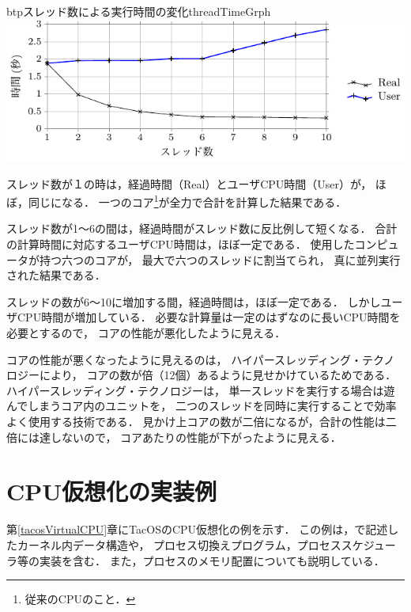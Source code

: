 \begin{myfig}{btp}{スレッド数による実行時間の変化}{threadTimeGrph}
  \includegraphics[scale=1.0]{Tbl/threadTimeGrph.pdf}
\end{myfig}

スレッド数が１の時は，経過時間（Real）とユーザCPU時間（User）が，
ほぼ，同じになる．
一つのコア\footnote{従来のCPUのこと．}が全力で合計を計算した結果である．

スレッド数が1〜6の間は，経過時間がスレッド数に反比例して短くなる．
合計の計算時間に対応するユーザCPU時間は，ほぼ一定である．
使用したコンピュータが持つ六つのコアが，
最大で六つのスレッドに割当てられ，
真に並列実行された結果である．

スレッドの数が6〜10に増加する間，経過時間は，ほぼ一定である．
しかしユーザCPU時間が増加している．
必要な計算量は一定のはずなのに長いCPU時間を必要とするので，
コアの性能が悪化したように見える．

コアの性能が悪くなったように見えるのは，
ハイパースレッディング・テクノロジー\cite{hyperThreading}により，
コアの数が倍（12個）あるように見せかけているためである．
ハイパースレッディング・テクノロジーは，
単一スレッドを実行する場合は遊んでしまうコア内のユニットを，
二つのスレッドを同時に実行することで効率よく使用する技術である．
見かけ上コアの数が二倍になるが，合計の性能は二倍には達しないので，
コアあたりの性能が下がったように見える．


\section{CPU仮想化の実装例}
第\ref{tacosVirtualCPU}章にTacOSのCPU仮想化の例を示す．
この例は，{\cmml}で記述したカーネル内データ構造や，
プロセス切換えプログラム，プロセススケジューラ等の実装を含む．
また，プロセスのメモリ配置についても説明している．

